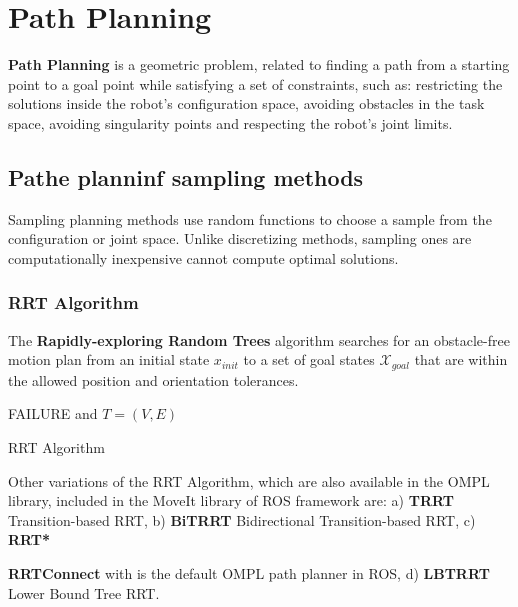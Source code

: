 \chapter{Path Planning}

\textbf{Path Planning} is a geometric problem, related to finding a path from a starting point to a goal point while satisfying a set of constraints, such as: restricting the solutions inside the robot's configuration space, avoiding obstacles in the task space, avoiding singularity points and respecting the robot's 
joint limits.
%
\section{Pathe planninf sampling methods}
%
Sampling planning methods use random functions to choose a sample from the configuration or joint space. Unlike discretizing methods, sampling ones are 
computationally inexpensive cannot compute optimal solutions.
%
\subsection{RRT Algorithm}
%
The \textbf{Rapidly-exploring Random Trees} algorithm searches for an obstacle-free motion plan from an initial state $x_{init}$ to a set of goal states $\mathcal{X}_{goal}$ that are within the allowed position and orientation tolerances.

\small
\begin{algorithm}[H]
\SetAlgoLined
{}
\Return FAILURE and $ T=(V,E) $ \;
\caption{RRT Algorithm}
\end{algorithm}
\nprmalsize

Other variations of the RRT Algorithm, which are also available in the OMPL library, included in the MoveIt library of ROS framework  are:
a) \textbf{TRRT} Transition-based RRT, b) \textbf{BiTRRT} Bidirectional Transition-based RRT, c) \textbf{RRT*}
	\item \textbf{RRTConnect} with is the default OMPL path planner in ROS, d) \textbf{LBTRRT} Lower Bound Tree RRT.
%
